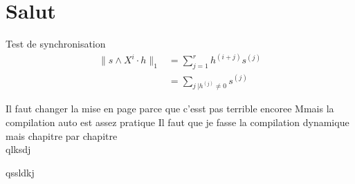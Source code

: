 \chapter{Salut}

Test de synchronisation \\
\begin{align*}
\|s\wedge X^i\cdot h\|_1 &= \sum\limits_{j=1}^r h^{(i+j)}s^{(j)} \\
&= \sum\limits_{j\ | h^{(j)}\neq 0} s^{(j)}
\end{align*}

Il faut changer la mise en page parce que c'esst pas terrible encoree
Mmais la compilation auto est assez pratique
Il faut que je fasse la compilation dynamique mais chapitre par chapitre \\


qlksdj



qssldkj

